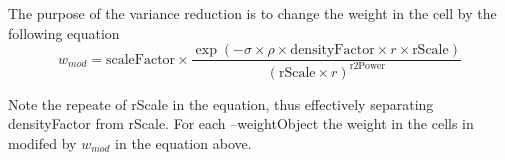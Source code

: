 



  The purpose of the variance reduction is to change the weight in the cell by the following equation 
  \begin{equation}
    \label{weigthEqn}
    w_{mod}= \textrm{scaleFactor} \times \frac{\exp (-\sigma \times \rho \times \textrm{densityFactor}
      \times r \times \textrm{rScale}) }
    { (\textrm{rScale} \times r )^{\textrm{r2Power}} }
  \end{equation}

  Note the repeate of rScale in the equation, thus effectively separating densityFactor from rScale.
  For each --weightObject the weight in the cells in modifed by $w_{mod}$ in the equation above. 
  
